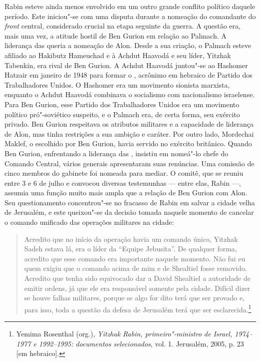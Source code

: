 Rabin esteve ainda menos envolvido em um outro grande conflito político daquele
período. Este iniciou"-se com uma disputa durante a nomeação do
comandante do \emph{front} central, considerado crucial na etapa seguinte da
guerra. A questão era, mais uma vez, a atitude hostil de Ben Gurion em
relação ao Palmach. A liderança das  queria a nomeação de Alon. Desde
a sua criação, o Palmach esteve afiliado ao Hakibutz Hameuchad e à Achdut
Haavodá e seu líder, Yitzhak Tabenkin, era rival de Ben Gurion. A Achdut
Haavodá juntou"-se ao Hashomer Hatzair em janeiro de 1948 para formar o
, acrônimo em hebraico de Partido dos Trabalhadores Unidos. O
Hashomer era um movimento sionista marxista, enquanto o Achdut Haavodá
combinava o socialismo com nacionalismo israelense. Para Ben Gurion, esse
Partido dos Trabalhadores Unidos era um movimento político
pró"-soviético suspeito, e o Palmach era, de certa forma, seu exército
privado. Ben Gurion respeitava os atributos militares e a capacidade de
liderança de Alon, mas tinha restrições a sua ambição e caráter. Por outro lado,
Mordechai Maklef, o escolhido por Ben Gurion, havia servido
no exército britânico. Quando Ben Gurion, enfrentando a liderança das
, insistiu em nomeá"-lo chefe do Comando Central, vários generais
apresentaram suas renúncias. Uma comissão de cinco membros do gabinete
foi nomeada para mediar. O comitê, que se reuniu entre 3 e 6 de julho e
convocou diversas testemunhas --- entre elas, Rabin ---, assumia uma função
muito mais ampla que a relação de Ben Gurion com Alon. Seu
questionamento concentrou"-se no fracasso de Rabin em salvar a cidade
velha de Jerusalém, e este queixou"-se da decisão tomada naquele momento
de cancelar o comando unificado das operações militares na cidade:

\begin{quote}
Acredito que no início da operação havia um comando único, Yitzhak
Sadeh estava lá, era o líder da ``Equipe Jebusita''. De qualquer forma,
acredito que esse comando era importante naquele momento. Não fui eu
quem exigiu que o comando acima de mim e de Shealtiel fosse removido.
Acredito que tenha sido equivocado dar a David Shealtiel a autoridade de
emitir ordens, já que ele era responsável somente pela cidade. Difícil
dizer se houve falhas militares, porque se algo for dito terá que ser
provado e, para isso, toda a questão da defesa de Jerusalém terá que ser
esclarecida.\footnote{Yemima Rosenthal (org.), \emph{Yitzhak Rabin, primeiro"-ministro de
Israel, 1974--1977 e 1992--1995: documentos selecionados}, vol. 1. Jerusalém,
2005, p. 23 {[}em hebraico{]}.}
\end{quote}

